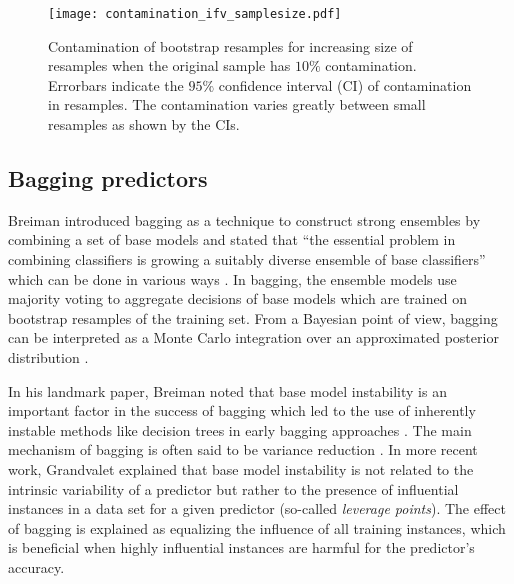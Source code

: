 \begin{figure}[!h]
  \centering
  \texttt{[image: contamination\_ifv\_samplesize.pdf]}
  \caption{Contamination of bootstrap resamples for increasing size of resamples when the original sample has $10\%$ contamination. Errorbars indicate the $95\%$ confidence interval (CI) of contamination in resamples. The contamination varies greatly between small resamples as shown by the CIs. } 
  \label{fig:contamination}
\end{figure}


\subsection{Bagging predictors}
Breiman \citep{Breiman:1996:BP:231986.231989} introduced bagging as a technique to construct strong ensembles by combining a set of base models and stated that ``the essential problem in combining classifiers is growing a suitably diverse ensemble of base classifiers'' which can be done in various ways \citep{brown2005diversity}. In bagging, the ensemble models use majority voting to aggregate decisions of base models which are trained on bootstrap resamples of the training set. From a Bayesian point of view, bagging can be interpreted as a Monte Carlo integration over an approximated posterior distribution \citep{rao1997out}. 

In his landmark paper, Breiman \citep{Breiman:1996:BP:231986.231989} noted that base model instability is an important factor in the success of bagging which led to the use of inherently instable methods like decision trees in early bagging approaches \citep{dietterich2000experimental, breiman2001random}. The main mechanism of bagging is often said to be variance reduction \citep{bauer1999empirical,breiman2000randomizing}. In more recent work, Grandvalet \citep{grandvalet2004bagging} explained that base model instability is not related to the intrinsic variability of a predictor but rather to the presence of influential instances in a data set for a given predictor (so-called \emph{leverage points}). The effect of bagging is explained as equalizing the influence of all training instances, which is beneficial when highly influential instances are harmful for the predictor's accuracy. 


